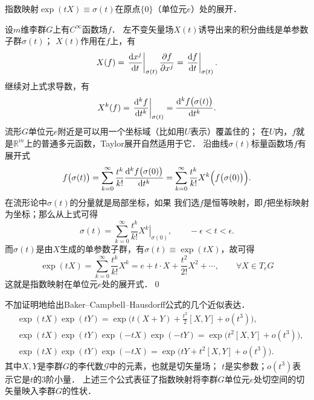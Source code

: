 \begin{example}
    指数映射$\exp(t X)\equiv \sigma(t)$在原点$\{0\}$（单位元$e$）处的展开．
\end{example}
设$m$维李群$G$上有$C^\infty$函数场$f$．
左不变矢量场$X(t)$诱导出来的积分曲线是单参数子群$\sigma(t)$；%
$X(t)$作用在$f$上，有
\begin{equation}
    X(f) = \left.\frac{{\rm d} x^j}{{\rm d} t}\right|_{\sigma(t)}
     \frac{\partial f}{\partial x^j}
     = \left.\frac{{\rm d} f}{{\rm d} t}\right|_{\sigma(t)} .
\end{equation}
继续对上式求导数，有
\begin{equation}
    X^k(f) = \left.\frac{{\rm d}^k f}{{\rm d} t^k}\right|_{\sigma(t)} 
      = \frac{{\rm d}^k f\bigl(\sigma(t)\bigr)}{{\rm d} t^k}.
\end{equation}
流形$G$单位元$e$附近是可以用一个坐标域（比如用$U$表示）覆盖住的；
在$U$内，$f$就是$\mathbb{R}^m$上的普通多元函数，Taylor展开自然适用于它．
沿曲线$\sigma(t)$标量函数场$f$有展开式
\begin{equation}
    f\bigl(\sigma(t)\bigr) = \sum_{k=0}^{\infty}  \frac{t^k}{k!}
    \frac{{\rm d}^k f\bigl(\sigma(0)\bigr)}{{\rm d} t^k}
    =\sum_{k=0}^{\infty}  \frac{t^k}{k!}   X^k \Bigl(f\bigl(\sigma(0)\bigr)\Bigr).
\end{equation}
在流形论中$\sigma(t)$的分量就是局部坐标，如果
我们选$f$是恒等映射，即$f$把坐标映射为坐标；那么从上式可得
\begin{equation}
    \sigma(t) = \sum_{k=0}^{\infty} \frac{t^k}{k!} \left. X^k\right|_{\sigma(0)},
    \qquad -\epsilon < t <\epsilon .
\end{equation}
而$\sigma(t)$是由$X$生成的单参数子群，有$\sigma(t)\equiv \exp(tX)$，故可得
\begin{equation}\label{chlg:eqn_exp-pand}
    \exp(t X) = \sum_{k=0}^{\infty} \frac{t^k}{k!} X^k = e + t\cdot X 
      + \frac{t^2}{2!} X^2 + \cdots, \qquad \forall X\in T_e G
\end{equation}
这就是指数映射在单位元$e$处的展开式．\qed


不加证明地给出Baker--Campbell--Hausdorff公式\cite[\S 3.8]{huangxg-2024}的几个近似表达． 
\begin{align}
    &\exp(tX) \exp(tY) = \exp\bigl(t(X+Y)+\frac{t^2}{2} [X,Y]+o(t^3)\bigr), \label{chlg:eqn_BCH-xy} \\
    &\exp(tX) \exp(tY) \exp(-tX) \exp(-tY) =  \exp\bigl(t^2[X,Y]+o(t^3)\bigr), \label{chlg:eqn_BCH-xy-x-y} \\
    &\exp(tX) \exp(tY) \exp(-tX) =  \exp\bigl(tY+t^2[X,Y]+o(t^3)\bigr) . \label{chlg:eqn_BCH-xy-x}
\end{align}
其中$X,Y$是李群$G$的李代数$\mathscr{G}$中的元素，也就是切矢量场；
$t$是实参数；$o(t^3)$表示它是$t$的3阶小量．
上述三个公式表征了指数映射将李群$G$单位元$e$处切空间的切矢量映入李群$G$的性状．



